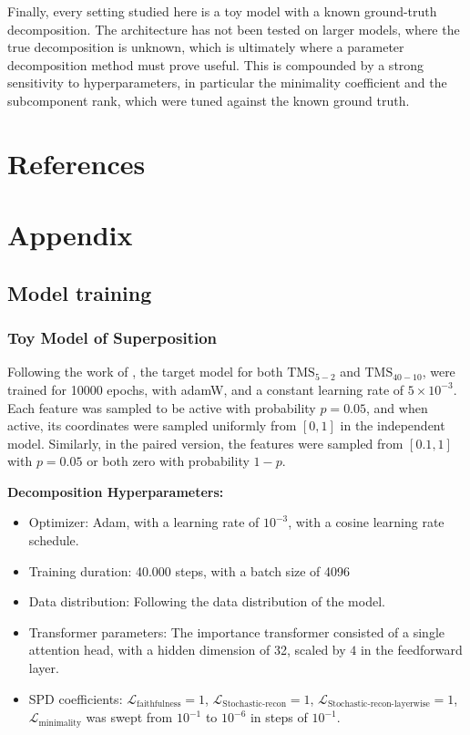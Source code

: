 \documentclass{article}
\begin{document}
Finally, every setting studied here is a toy model with
a known ground-truth decomposition. The
architecture has not been tested on larger models,
where the true decomposition is unknown, which is
ultimately where a parameter decomposition method must prove useful.
This is compounded by a strong sensitivity to hyperparameters,
in particular the minimality coefficient and the subcomponent rank,
which were tuned against the known ground truth.
\section{References}
\printbibliography[heading=none]


\section{Appendix}
\subsection{Model training}
\subsubsection{Toy Model of Superposition}
Following the work of \autocite{stochasticparameterdecomposition},
the target model for both $\text{TMS}_{5-2}$  and $\text{TMS}_{40-10}$,
were trained for 10000 epochs,
with adamW, and a constant learning rate of $5 \times 10^{-3}$. 
Each feature was sampled to be active with probability $p = 0.05$, and when active, its coordinates were sampled uniformly from $[0,1]$
in the independent model. Similarly, in the paired
version, the features were sampled from $[0.1,1]$ with $p=0.05$ or both zero with probability $1-p$.

\textbf{Decomposition Hyperparameters:}
\renewcommand\labelitemi{\tiny$\bullet$}
\begin{itemize}
    \setlength\itemsep{0em}
    \item Optimizer: Adam, with a learning rate of $10^{-3}$, with a cosine learning rate schedule.
    \item Training duration: 40.000 steps, with a batch size of 4096
    \item Data distribution: Following the data distribution of the model.
    \item Transformer parameters: The importance transformer consisted of a single attention head, with a hidden dimension of 32, scaled by $4$ in the feedforward layer. 
    \item SPD coefficients: $\mathcal{L}_{\text{faithfulness}}=1$, $\mathcal{L}_{\text{Stochastic-recon}}=1$, $\mathcal{L}_{\text{Stochastic-recon-layerwise}}=1$, $\mathcal{L}_{\text{minimality}}$ was swept from $10^{-1}$ to $10^{-6}$ in steps of $10^{-1}$.
\end{itemize}
\end{document}
